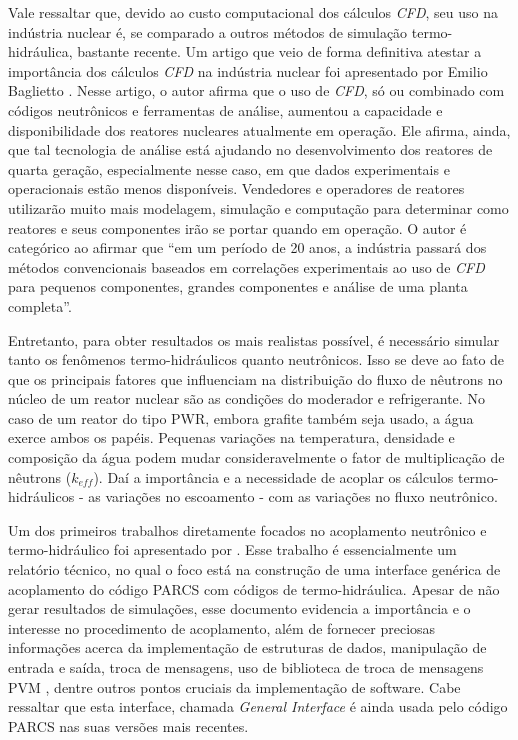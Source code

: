Vale ressaltar que, devido ao custo computacional dos cálculos \textit{CFD}, seu uso na indústria
nuclear é, se comparado a outros métodos de simulação termo-hidráulica, bastante recente. Um artigo que
veio de forma definitiva atestar a importância dos cálculos \textit{CFD} na indústria nuclear
foi apresentado por Emilio Baglietto \cite{Baglietto2011}. Nesse artigo, o autor afirma
que o uso de \textit{CFD}, só ou combinado com códigos neutrônicos e ferramentas
de análise, aumentou a capacidade e disponibilidade dos reatores nucleares
atualmente em operação. Ele afirma,
ainda, que tal tecnologia de análise está ajudando no desenvolvimento dos reatores
de quarta geração, especialmente nesse caso, em que dados experimentais e operacionais
estão menos disponíveis. Vendedores e operadores de reatores utilizarão muito mais
modelagem, simulação e computação para determinar como reatores e seus componentes
irão se portar quando em operação. O autor é categórico ao afirmar que ``em um
período de 20 anos, a indústria passará dos métodos convencionais baseados em
correlações experimentais ao uso de \textit{CFD} para pequenos componentes, grandes componentes
e análise de uma planta completa''. 

Entretanto, para obter resultados os mais realistas possível, é necessário simular 
tanto os fenômenos termo-hidráulicos quanto neutrônicos. Isso 
se deve ao fato de que os principais fatores que influenciam na distribuição do fluxo de 
nêutrons no núcleo de um reator nuclear são as condições do moderador e refrigerante. No caso de um
reator do tipo PWR, embora grafite também seja usado, a água exerce ambos os papéis.
Pequenas variações na temperatura, densidade e composição 
da água podem mudar consideravelmente o fator de multiplicação de nêutrons ($k_{eff}$). Daí a importância e 
a necessidade de acoplar os cálculos termo-hidráulicos - as variações no escoamento - com as variações 
no fluxo neutrônico.


Um dos primeiros trabalhos diretamente focados no 
acoplamento neutrônico e termo-hidráulico foi apresentado por \cite{Barber98}. Esse trabalho 
é essencialmente um relatório técnico, no qual o foco está na construção de uma interface 
genérica de acoplamento do código PARCS com códigos de termo-hidráulica. Apesar de não 
gerar resultados de simulações, esse documento evidencia a importância e o interesse 
no procedimento de acoplamento, além de fornecer preciosas informações acerca da 
implementação de estruturas de dados, manipulação de entrada e saída, troca de mensagens, 
uso de biblioteca de troca de mensagens PVM \cite{Geist94}, dentre outros pontos cruciais
da implementação de software. Cabe ressaltar que esta interface, 
chamada \textit{General Interface} é ainda usada pelo código PARCS nas suas versões mais 
recentes. 


